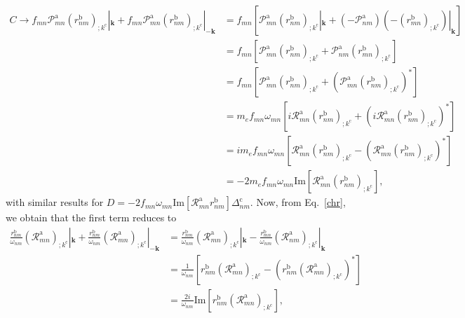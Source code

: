 \begin{align}\label{ct}
C\to f_{mn}\mathcal{P}^{\mathrm{a}}_{mn}(r^{\mathrm{b}}_{nm})_{;k^{\mathrm{c}}}|_{\mathbf{k}}
+
f_{mn}\mathcal{P}^{\mathrm{a}}_{mn}(r^{\mathrm{b}}_{nm})_{;k^{\mathrm{c}}}|_{-\mathbf{k}}
&=
f_{mn}\left[\mathcal{P}^{\mathrm{a}}_{mn}(r^{\mathrm{b}}_{nm})_{;k^{\mathrm{c}}}|_{\mathbf{k}}
+
(-\mathcal{P}^{\mathrm{a}}_{nm})(-(r^{\mathrm{b}}_{mn})_{;k^{\mathrm{c}}})|_{\mathbf{k}}
\right]
\nonumber\\
&=
f_{mn}\left[\mathcal{P}^{\mathrm{a}}_{mn}(r^{\mathrm{b}}_{nm})_{;k^{\mathrm{c}}}
+
\mathcal{P}^{\mathrm{a}}_{nm}(r^{\mathrm{b}}_{mn})_{;k^{\mathrm{c}}}
\right]
\nonumber\\
&=
f_{mn}\left[\mathcal{P}^{\mathrm{a}}_{mn}(r^{\mathrm{b}}_{nm})_{;k^{\mathrm{c}}}
+
(\mathcal{P}^{\mathrm{a}}_{mn}(r^{\mathrm{b}}_{nm})_{;k^{\mathrm{c}}})^*
\right]
\nonumber\\
&= 
m_ef_{mn}\omega_{mn}\left[i\mathcal{R}^{\mathrm{a}}_{mn}(r^{\mathrm{b}}_{nm})_{;k^{\mathrm{c}}}
+
(i\mathcal{R}^{\mathrm{a}}_{mn}(r^{\mathrm{b}}_{nm})_{;k^{\mathrm{c}}})^*
\right]
\nonumber\\
&= 
im_ef_{mn}\omega_{mn}\left[\mathcal{R}^{\mathrm{a}}_{mn}(r^{\mathrm{b}}_{nm})_{;k^{\mathrm{c}}}
-
(\mathcal{R}^{\mathrm{a}}_{mn}(r^{\mathrm{b}}_{nm})_{;k^{\mathrm{c}}})^*
\right]
\nonumber\\
&= 
-2m_ef_{mn}\omega_{mn}\mathrm{Im}[\mathcal{R}^{\mathrm{a}}_{mn}(r^{\mathrm{b}}_{nm})_{;k^{\mathrm{c}}}]
,
\end{align}
with similar results for 
$D=-2f_{mn}\omega_{mn}\mathrm{Im}[\mathcal{R}^{\mathrm{a}}_{mn}r^{\mathrm{b}}_{nm}]\Delta^{\mathrm{c}}_{nm}$.
 Now, from Eq.~\eqref{chr}, we obtain
that the first term reduces to
\begin{align}\label{chrn2}
\frac{r^{\mathrm{b}}_{nm}}{\omega_{nm}}\left(\mathcal{R}^{\mathrm{a}}_{mn}\right)_{;k^{\mathrm{c}}}|_{\mathbf{k}}
+
\frac{r^{\mathrm{b}}_{nm}}{\omega_{nm}}\left(\mathcal{R}^{\mathrm{a}}_{mn}\right)_{;k^{\mathrm{c}}}|_{-\mathbf{k}}
&=
\frac{r^{\mathrm{b}}_{nm}}{\omega_{nm}}\left(\mathcal{R}^{\mathrm{a}}_{mn}\right)_{;k^{\mathrm{c}}}|_{\mathbf{k}}
-
\frac{r^{\mathrm{b}}_{mn}}{\omega_{nm}}\left(\mathcal{R}^{\mathrm{a}}_{nm}\right)_{;k^{\mathrm{c}}}|_{\mathbf{k}}
\nonumber\\
&=
\frac{1}{\omega_{nm}}\left[r^{\mathrm{b}}_{nm}\left(\mathcal{R}^{\mathrm{a}}_{mn}\right)_{;k^{\mathrm{c}}}
-
(r^{\mathrm{b}}_{nm}\left(\mathcal{R}^{\mathrm{a}}_{mn}\right)_{;k^{\mathrm{c}}})^*\right]
\nonumber\\
&=
\frac{2i}{\omega_{nm}}\mathrm{Im}[r^{\mathrm{b}}_{nm}\left(\mathcal{R}^{\mathrm{a}}_{mn}\right)_{;k^{\mathrm{c}}}]
,
\end{align}
